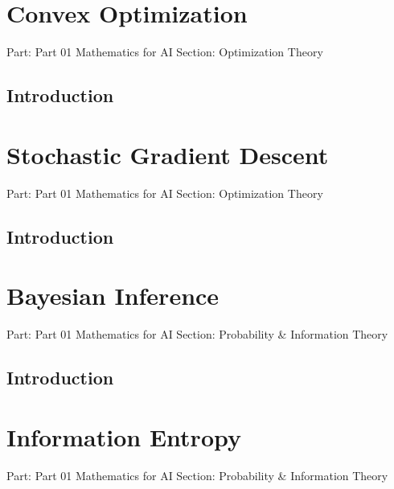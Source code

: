 \documentclass[11pt,a4paper,twoside]{book}
\begin{document}
\newpage

\hypertarget{convex-optimization}{%
\section{Convex Optimization}\label{convex-optimization}}

Part: Part 01 Mathematics for AI Section: Optimization Theory

\hypertarget{introduction}{%
\subsection{Introduction}\label{introduction}}


\newpage

\hypertarget{stochastic-gradient-descent}{%
\section{Stochastic Gradient
Descent}\label{stochastic-gradient-descent}}

Part: Part 01 Mathematics for AI Section: Optimization Theory

\hypertarget{introduction}{%
\subsection{Introduction}\label{introduction}}


\newpage

\hypertarget{bayesian-inference}{%
\section{Bayesian Inference}\label{bayesian-inference}}

Part: Part 01 Mathematics for AI Section: Probability \& Information
Theory

\hypertarget{introduction}{%
\subsection{Introduction}\label{introduction}}


\newpage

\hypertarget{information-entropy}{%
\section{Information Entropy}\label{information-entropy}}

Part: Part 01 Mathematics for AI Section: Probability \& Information
Theory
\end{document}
